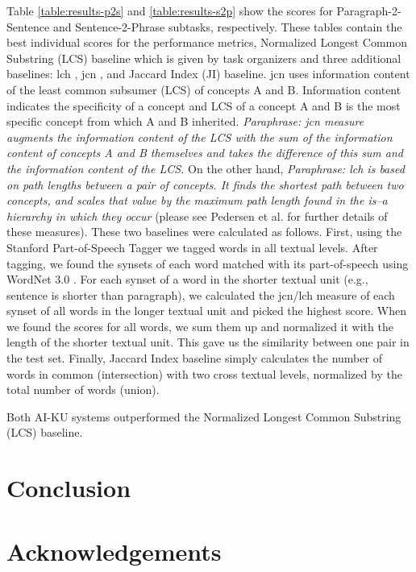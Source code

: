 \documentclass[11pt]{article}
\begin{document}
Table \ref{table:results-p2s} and \ref{table:results-s2p} show the scores for Paragraph-2-Sentence and Sentence-2-Phrase subtasks, respectively. These tables contain the best individual scores for the performance metrics, Normalized Longest Common Substring (LCS) baseline which is given by task organizers and three additional baselines: lch \cite{leacock1998combining}, jcn \cite{jiang1997semantic}, and Jaccard Index (JI) baseline. jcn uses information content \cite{resnik1995inforcontent} of the least common subsumer (LCS) of concepts A and B. Information content indicates the specificity of a concept and LCS of a concept A and B is the most specific concept from which A and B inherited. \emph{Paraphrase: jcn measure augments the information content of the LCS with the sum of the information content of concepts A and B themselves and takes the difference of this sum and the information content of the LCS.} On the other hand, \emph{Paraphrase: lch is based on path lengths between a pair of concepts. It finds the shortest path between two concepts, and scales that value by the maximum path length found in the is–a hierarchy in which they occur} (please see Pedersen et al.  for further details of these measures). These two baselines were calculated as follows. First, using the Stanford Part-of-Speech Tagger \cite{toutanova2000enriching} we tagged words in all textual levels. After tagging, we found the synsets of each word matched with its part-of-speech using WordNet 3.0 \cite{fellbaum98electronic}. For each synset of a word in the shorter textual unit (e.g., sentence is shorter than paragraph), we calculated the jcn/lch measure of each synset of all words in the longer textual unit and picked the highest score. When we found the scores for all words, we sum them up and normalized it with the length of the shorter textual unit. This gave us the similarity between one pair in the test set. Finally, Jaccard Index baseline simply calculates the number of words in common (intersection) with two cross textual levels, normalized by the total number of words (union). 

Both AI-KU systems outperformed the Normalized Longest Common Substring (LCS) baseline. 




\section{Conclusion}
\label{conclusion}



\section*{Acknowledgements}

\newpage


\end{document}
